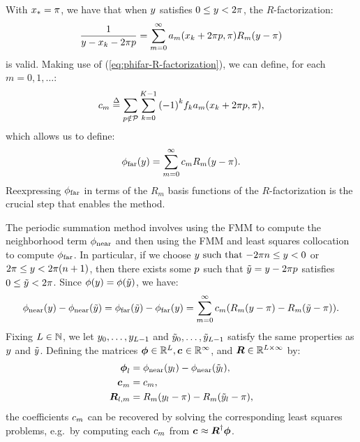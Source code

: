 With ${x}_{*} = \pi$, we have that when $y$ satisfies
$0 \leq y < 2\pi$, the $R$-factorization:
\begin{align}
  \label{eq:phifar-R-factorization}
  \frac{1}{y - {x}_{k} - 2\pi p} = \sum_{m=0}^{\infty}a_m({x}_{k} + 2\pi p, \pi)R_m(y - \pi)
\end{align}
is valid. Making use of (\ref{eq:phifar-R-factorization}), we can
define, for each $m = 0, 1, \hdots$:
\begin{align}
  \label{eq:phifar-over-R-coefs}
  {c}_{m} \overset{\Delta}{=} \sum_{p\notin\mathcal{P}}\sum_{k=0}^{K-1} {(-1)}^k {f}_{k} a_m({x}_{k} + 2\pi p, \pi),
\end{align}
which allows us to define:
\begin{align}
  \label{eq:phifar-over-R}
  \phi_{\operatorname{far}}(y) = \sum_{m=0}^\infty {c}_{m} R_m(y - \pi).
\end{align}
Reexpressing $\phi_{\operatorname{far}}$ in terms of the $R_m$ basis functions of the
$R$-factorization is the crucial step that enables the method.

The periodic summation method involves using the FMM to compute the
neighborhood term $\phi_{\operatorname{near}}$ and then using the FMM and least squares
collocation to compute $\phi_{\operatorname{far}}$. In particular, if we choose
$y \mbox{ such that } {-2\pi n} \leq y < 0$ or
$2\pi \leq y < 2\pi(n + 1)$, then there exists
some $p$ such that ${\tilde{y}} = y - 2\pi p$
satisfies $0 \leq {\tilde{y}} < 2\pi$. Since
$\phi(y) = \phi({\tilde{y}})$, we have:
\begin{align}
  \label{eq:phinear-minus-phinear}
  \phi_{\operatorname{near}}(y) - \phi_{\operatorname{near}}({\tilde{y}}) = \phi_{\operatorname{far}}({\tilde{y}}) - \phi_{\operatorname{far}}(y) = \sum_{m=0}^\infty {c}_{m}(R_m(y - \pi) - R_m({\tilde{y}} - \pi)).
\end{align}
Fixing $L\in\mathbb{N}$, we let
$y_0, \hdots, y_{L - 1}$ and
${\tilde{y}}_0, \hdots, {\tilde{y}}_{L - 1}$ satisfy the same
properties as $y$ and ${\tilde{y}}$. Defining the matrices
$\boldsymbol{\phi} \in \mathbb{R}^L, \boldsymbol{{c}_{}} \in \mathbb{R}^\infty$, and
$\boldsymbol{R} \in \mathbb{R}^{L\times\infty}$ by:
\begin{align}
  \boldsymbol{\phi}_l &= \phi_{\operatorname{near}}(y_l) - \phi_{\operatorname{near}}({\tilde{y}}_l), \label{eq:phi-vector} \\
  \boldsymbol{{c}_{}}_m &= {c}_{m}, \label{eq:coef-vector} \\
  \boldsymbol{R}_{l,m} &= R_m(y_l - \pi) - R_m({\tilde{y}}_l - \pi), \label{eq:fitting-matrix}
\end{align}
the coefficients ${c}_{m}$ can be recovered by solving the
corresponding least squares problems, e.g.\ by computing each
${c}_{m}$ from
$\boldsymbol{{c}_{}} \approx \boldsymbol{R}^\dagger \boldsymbol{\phi}$.

